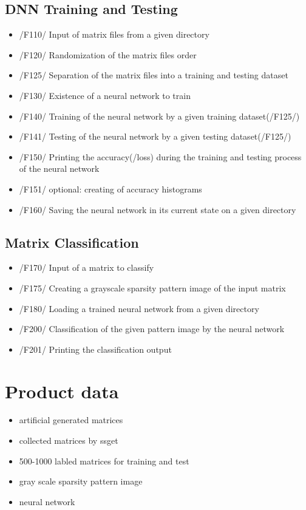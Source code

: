 \documentclass[parskip=full]{scrartcl}
\begin{document}
	
\subsection{DNN Training and Testing}
	\begin{itemize}
	\item /F110/ Input of matrix files from a given directory
	\item /F120/ Randomization of the matrix files order
	\item /F125/ Separation of the matrix files into a training and testing dataset
	\item /F130/ Existence of a \gls{neural network} to train
	\item /F140/ Training of the \gls{neural network} by a given training dataset(/F125/)
	\item /F141/ Testing of the \gls{neural network} by a given testing dataset(/F125/)
	\item /F150/ Printing the accuracy(/loss) during the training and testing process of the \gls{neural network}
	\item /F151/ optional: creating of accuracy histograms
	\item /F160/ Saving the \gls{neural network} in its current state on a given directory
	\end{itemize}
 	
\subsection{Matrix Classification}
	\begin{itemize}
	\item /F170/ Input of a matrix to classify
	\item /F175/ Creating a grayscale \gls{sparsity pattern image} of the input matrix
	\item /F180/ Loading a trained \gls{neural network} from a given directory
	\item /F200/ Classification of the given pattern image by the \gls{neural network}
	\item /F201/ Printing the classification output
	\end{itemize}

\section{Product data}
	\begin{itemize}
	\item artificial generated matrices
	\item collected matrices by \gls{ssget}
	\item 500-1000 labled matrices for training and test
	\item gray scale \gls{sparsity pattern image}
	\item \gls{neural network}

	\end{itemize}
\end{document}
